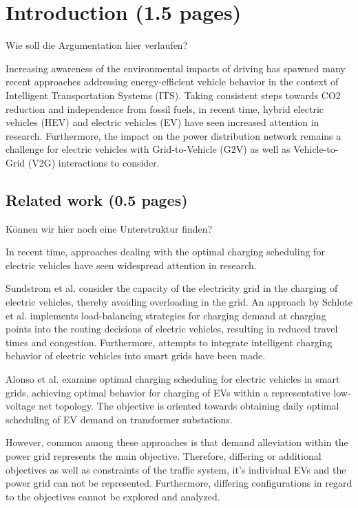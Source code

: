 \section{Introduction (1.5 pages)}

{\color{red} Wie soll die Argumentation hier verlaufen?}

Increasing awareness of the environmental impacts of driving has spawned many recent approaches addressing energy-efficient vehicle behavior in the context of Intelligent Transportation Systems (ITS). Taking consistent steps towards CO2 reduction and independence from fossil fuels, in recent time, hybrid electric vehicles (HEV) and electric vehicles (EV) have seen increased attention in research. 
Furthermore, the impact on the power distribution network remains a challenge for electric vehicles with Grid-to-Vehicle (G2V) as well as Vehicle-to-Grid (V2G) interactions to consider.

\subsection{Related work (0.5 pages)}
\label{section:related_work}

{\color{red} K\"onnen wir hier noch eine Unterstruktur finden?}

In recent time, approaches dealing with the optimal charging scheduling for electric vehicles have seen widespread attention in research. 

Sundstrom et al. \cite{sundstrom2010planning} consider the capacity of the electricity grid in the charging of electric vehicles, thereby avoiding overloading in the grid.
An approach by Schlote et al. \cite{schlote2012balanced} implements load-balancing strategies for charging demand at charging points into the routing decisions of electric vehicles, resulting in reduced travel times and congestion. 
Furthermore, attempts to integrate intelligent charging behavior of electric vehicles into smart grids have been made. 

Alonso et al. \cite{alonso2014optimal} examine optimal charging scheduling for electric vehicles in smart grids, achieving optimal behavior for charging of EVs within a representative low-voltage net topology. The objective is oriented towards obtaining daily optimal scheduling of EV demand on transformer substations.

However, common among these approaches is that demand alleviation within the power grid represents the main objective. Therefore, differing or additional objectives as well as constraints of the traffic system, it's individual EVs and the power grid can not be represented. Furthermore, differing configurations in regard to the objectives cannot be explored and analyzed. 

